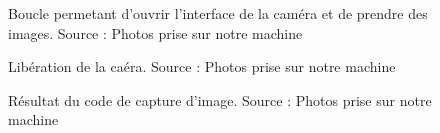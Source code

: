  	
 	\begin{figure}[H]%
 		\center%
 		\setlength{\fboxsep}{5pt}%
 		\setlength{\fboxrule}{0.5pt}%
 		\caption[Code de capture d'image (partie 2)]{Boucle permetant d'ouvrir l'interface de la caméra et de prendre des images. Source : Photos prise sur notre machine}%
 		\label{fig:Code de capture d'image(partie 2)}
 	\end{figure}
 	
 	\begin{figure}[H]%
 		\center%
 		\setlength{\fboxsep}{5pt}%
 		\setlength{\fboxrule}{0.5pt}%
 		\caption[Code de capture d'image (partie 3)]{ Libération de la caéra. Source : Photos prise sur notre machine}%
 		\label{fig:Code de capture d'image(partie 3)}
 	\end{figure}
 	
 	\begin{figure}[H]%
 		\center%
 		\setlength{\fboxsep}{5pt}%
 		\setlength{\fboxrule}{0.5pt}%
 		\caption[ Résultat du code de capture d'image ]{ Résultat du code de capture d'image. Source : Photos prise sur notre machine}%
 		\label{fig:Résultat du code de capture d'image}
 	\end{figure}
 	
